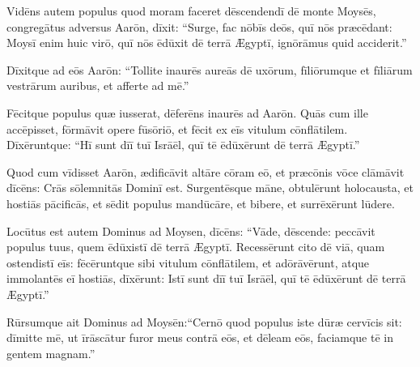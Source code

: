 Vidēns autem populus quod moram faceret dēscendendī dē monte
Moysēs, congregātus adversus Aarōn, dīxit: ``Surge, fac nōbīs deōs, quī
nōs præcēdant: Moysī enim huic
virō, quī nōs ēdūxit dē terrā Ægyptī, ignōrāmus quid acciderit.''

Dīxitque
ad eōs Aarōn: ``Tollite inaurēs aureās dē uxōrum,
fīliōrumque et fīliārum vestrārum auribus, et afferte ad mē.''

Fēcitque
populus quæ iusserat, dēferēns inaurēs
ad Aarōn. 
Quās cum ille accēpisset, fōrmāvit opere fūsōriō, et fēcit ex
eīs vitulum cōnflātilem. Dīxēruntque: ``Hī
sunt dīī tuī Isrāēl, quī tē ēdūxērunt dē terrā Ægyptī.''

Quod cum vīdisset Aarōn, ædificāvit altāre cōram eō, et
præcōnis vōce clāmāvit dīcēns: Crās sōlemnitās Dominī est. 
Surgen\-tēsque māne, obtulērunt
holocausta, et hostiās
pācificās, et sēdit populus
mandūcāre, et bibere, et surrēxērunt lūdere. 

Locūtus est
autem Dominus ad Moysen, dīcēns: ``Vāde, dēscende:
peccāvit populus tuus, quem
ēdūxistī dē terrā Ægyptī. 
Recessērunt cito dē viā, quam ostendistī eīs:
fēcēruntque sibi vitulum cōnflātilem, et adōrāvērunt, atque
immolantēs eī hostiās, dīxērunt: Istī
sunt dīī tuī Isrāēl, quī tē ēdūxērunt dē terrā Ægyptī.'' 

Rūrsumque ait Dominus ad Moysēn:\linebreak ``Cernō quod populus iste
dūræ cervīcis sit: 
dīmitte mē, ut īrāscātur furor meus contrā
eōs, et dēleam eōs, faciamque tē in gentem magnam.'' 

